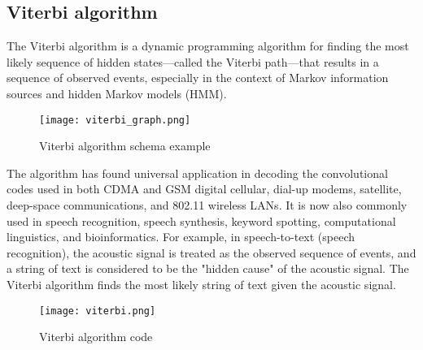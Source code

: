 \subsection{Viterbi algorithm} \label{subsec:viterbi}
The Viterbi algorithm is a dynamic programming algorithm for finding the most likely sequence of hidden
states—called the Viterbi path—that results in a sequence of observed events, especially in the
context of Markov information sources and hidden Markov models (HMM). \\
\begin{figure}[h!]
	\begin{center}
		\texttt{[image: viterbi\_graph.png]}
	\end{center}
	\caption{Viterbi algorithm schema example}
	\label{Viterbi schema}
\end{figure}
\newpage
The algorithm has found universal application in decoding the convolutional codes used in
both CDMA and GSM digital cellular, dial-up modems, satellite, deep-space communications, and 802.11 wireless LANs.
It is now also commonly used in speech recognition, speech synthesis, keyword spotting, computational
linguistics, and bioinformatics. For example, in speech-to-text (speech recognition), the acoustic signal
is treated as the observed sequence of events, and a string of text is considered to be the
"hidden cause" of the acoustic signal. The Viterbi algorithm finds the most likely string of text given
the acoustic signal. \\
\begin{figure}[h!]
	\begin{center}
		\texttt{[image: viterbi.png]}
	\end{center}
	\caption{Viterbi algorithm code}
	\label{Viterbi}
\end{figure}
